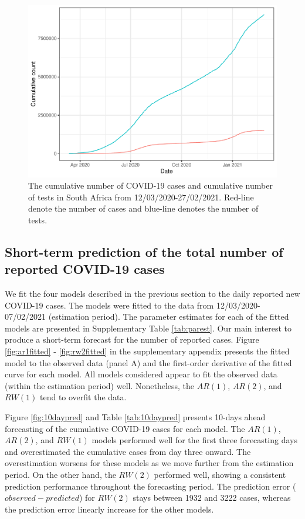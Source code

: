 \documentclass[10pt,letterpaper]{article}
\begin{document}
\begin{figure}[H]
\includegraphics[width=0.99\linewidth]{COVIDincidenceSA_files/figure-latex/cummulative-1} \caption{The cumulative number of COVID-19 cases and cumulative number of tests in South Africa from 12/03/2020-27/02/2021. Red-line denote the number of cases and blue-line denotes the number of tests.}\label{fig:cummulative}
\end{figure}

\hypertarget{short-term-prediction-of-the-total-number-of-reported-covid-19-cases}{%
\subsection{Short-term prediction of the total number of reported
COVID-19
cases}\label{short-term-prediction-of-the-total-number-of-reported-covid-19-cases}}

We fit the four models described in the previous section to the daily
reported new COVID-19 cases. The models were fitted to the data from 12/03/2020-07/02/2021 (estimation period). The parameter estimates for each of the fitted models
are presented in Supplementary Table \ref{tab:parest}. Our main interest to produce a short-term forecast for the number of reported cases.  Figure \ref{fig:ar1fitted} - \ref{fig:rw2fitted} in the supplementary appendix presents the fitted model to the observed data (panel A) and the first-order derivative of the fitted curve for each model. All models considered appear to fit the observed data (within the estimation period) well. Nonetheless, the \(AR(1)\), \(AR(2)\), and \(RW(1)\) tend to overfit the data. 

Figure \ref{fig:10daypred} and Table \ref{tab:10daypred} presents 10-days ahead forecasting of the cumulative COVID-19 cases for each model. The \(AR(1)\), \(AR(2)\), and \(RW(1)\) models performed well for the first three forecasting days and overestimated the cumulative cases from day three onward. The overestimation worsens for these models as we move further from the estimation period. On the other hand, the \(RW(2)\) performed well, showing a consistent prediction performance throughout the forecasting period.  The prediction error (\(observed - predicted\)) for \(RW(2)\) stays between 1932 and 3222 cases, whereas the prediction error linearly increase for the other models. 
\end{document}
